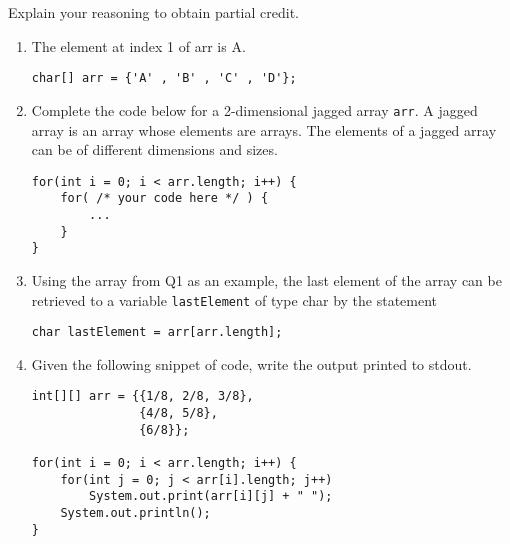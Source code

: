 \Instructions
   Explain your reasoning to obtain partial credit.
\begin{enumerate}
    
\item {} \tf The element at index 1 of arr is A.
\begin{lstlisting}
char[] arr = {'A' , 'B' , 'C' , 'D'};
\end{lstlisting}

\item {} Complete the code below for a 2-dimensional jagged array \texttt{arr}. A jagged array is an array whose elements are arrays. The elements of a jagged array can be of different dimensions and sizes. 
\begin{lstlisting}
for(int i = 0; i < arr.length; i++) {
	for( /* your code here */ ) {
    	...
    }
}
\end{lstlisting}
 
\item {} \tf Using the array from Q1 as an example, the last element of the array can be retrieved to a variable \texttt{lastElement} of type char by the statement
\begin{lstlisting}
char lastElement = arr[arr.length];
\end{lstlisting}

\item {} Given the following snippet of code, write the output printed to stdout. 

\begin{lstlisting}
int[][] arr = {{1/8, 2/8, 3/8},
			   {4/8, 5/8},
			   {6/8}};

for(int i = 0; i < arr.length; i++) {
	for(int j = 0; j < arr[i].length; j++)
		System.out.print(arr[i][j] + " ");
	System.out.println();
}
\end{lstlisting}

\clearpage

\clearpage
\ifdraft \clearpage \fi

\end{enumerate}   

              
